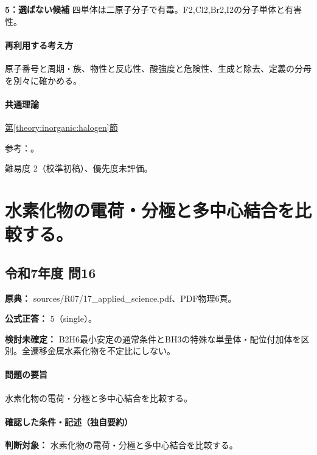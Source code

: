 \noindent\textbf{5：選ばない候補} 四単体は二原子分子で有毒。F2,Cl2,Br2,I2の分子単体と有害性。\par

\paragraph{再利用する考え方} 原子番号と周期・族、物性と反応性、酸強度と危険性、生成と除去、定義の分母を別々に確かめる。

\paragraph{共通理論} \hyperref[theory:inorganic:halogen]{第\ref*{theory:inorganic:halogen}節}

\par 参考：\cite{inorganic_halogen_ref,niosh_hf}。

\par 難易度 2（校準初稿）、優先度未評価。

\section{水素化物の電荷・分極と多中心結合を比較する。}

\subsection{令和7年度 問16}
\label{q:r07-reg-applied-16}

\noindent\textbf{原典：} sources/R07/17\_applied\_science.pdf、PDF物理6頁。

\textbf{公式正答：} 5（single）。

\par\textbf{検討未確定：} B2H6最小安定の通常条件とBH3の特殊な単量体・配位付加体を区別。全遷移金属水素化物を不定比にしない。

\paragraph{問題の要旨} 水素化物の電荷・分極と多中心結合を比較する。

\paragraph{確認した条件・記述（独自要約）}\mbox{}\par

\noindent\textbf{判断対象：} 水素化物の電荷・分極と多中心結合を比較する。\par

